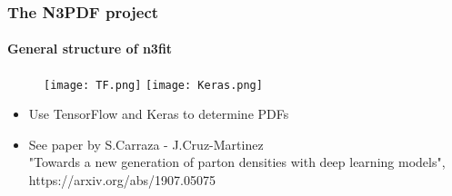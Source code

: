 \documentclass[aspectratio=43]{beamer}
\begin{document}
\begin{frame}

	\frametitle{The N3PDF project}
	\framesubtitle{General structure of n3fit}

	\begin{figure}[!htb]
		\texttt{[image: TF.png]}
		\endminipage\hfill
		\texttt{[image: Keras.png]}
		\endminipage\hfill
	\end{figure}

	\begin{itemize}
		\item Use TensorFlow and Keras to determine PDFs
		\item See paper by S.Carraza - J.Cruz-Martinez \\
		{\color{blue}"Towards a new generation of parton densities with deep learning models", https://arxiv.org/abs/1907.05075}
	\end{itemize}

\end{frame}
\end{document}

